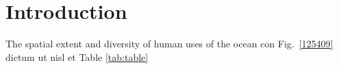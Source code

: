 \section{Introduction}
\label{introduction}

The spatial extent and diversity of human uses of the ocean con Fig.~\ref{125409} dictum ut nisl et Table \ref{tab:table}
